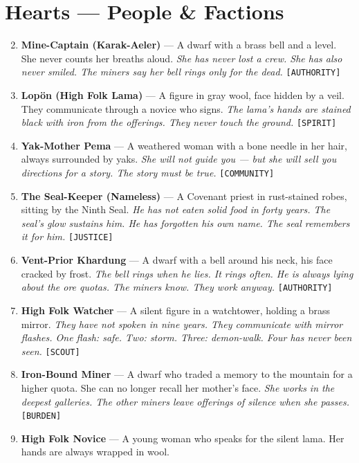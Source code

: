 \section*{Hearts --- People \& Factions}
\label{sec:himadri-people}
\begin{enumerate}
\setcounter{enumi}{1}
\item \textbf{Mine-Captain (Karak-Aeler)} --- A dwarf with a brass bell and a level. She never counts her breaths aloud.
  \hfill \textit{She has never lost a crew. She has also never smiled. The miners say her bell rings only for the dead.} \texttt{[AUTHORITY]}
\item \textbf{Lopön (High Folk Lama)} --- A figure in gray wool, face hidden by a veil. They communicate through a novice who signs.
  \hfill \textit{The lama's hands are stained black with iron from the offerings. They never touch the ground.} \texttt{[SPIRIT]}
\item \textbf{Yak-Mother Pema} --- A weathered woman with a bone needle in her hair, always surrounded by yaks.
  \hfill \textit{She will not guide you --- but she will sell you directions for a story. The story must be true.} \texttt{[COMMUNITY]}
\item \textbf{The Seal-Keeper (Nameless)} --- A Covenant priest in rust-stained robes, sitting by the Ninth Seal.
  \hfill \textit{He has not eaten solid food in forty years. The seal's glow sustains him. He has forgotten his own name. The seal remembers it for him.} \texttt{[JUSTICE]}
\item \textbf{Vent-Prior Khardung} --- A dwarf with a bell around his neck, his face cracked by frost.
  \hfill \textit{The bell rings when he lies. It rings often. He is always lying about the ore quotas. The miners know. They work anyway.} \texttt{[AUTHORITY]}
\item \textbf{High Folk Watcher} --- A silent figure in a watchtower, holding a brass mirror.
  \hfill \textit{They have not spoken in nine years. They communicate with mirror flashes. One flash: safe. Two: storm. Three: demon-walk. Four has never been seen.} \texttt{[SCOUT]}
\item \textbf{Iron-Bound Miner} --- A dwarf who traded a memory to the mountain for a higher quota. She can no longer recall her mother's face.
  \hfill \textit{She works in the deepest galleries. The other miners leave offerings of silence when she passes.} \texttt{[BURDEN]}
\item \textbf{High Folk Novice} --- A young woman who speaks for the silent lama. Her hands are always wrapped in wool.

\end{enumerate}
